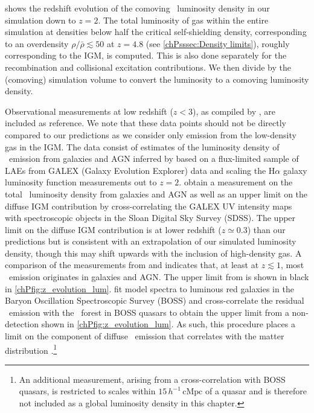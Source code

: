  shows the redshift evolution of the comoving \lya\ luminosity density in our simulation down to $z=2$. The total luminosity of gas within the entire simulation at densities below half the critical self-shielding density, corresponding to an overdensity $\rho/\bar{\rho} \lesssim 50$ at $z=4.8$ (see \cref{chPsssec:Density limits}), roughly corresponding to the IGM, is computed. This is also done separately for the recombination and collisional excitation contributions. We then divide by the (comoving) simulation volume to convert the luminosity to a comoving luminosity density.

Observational measurements at low redshift ($z<3$), as compiled by \citet{2019ApJ...877..150C}, are included as reference. We note that these data points should not be directly compared to our predictions as we consider only emission from the low-density gas in the IGM. The data consist of estimates of the luminosity density of \lya\ emission from galaxies and AGN inferred by \citet{2017ApJ...848..108W} based on a flux-limited sample of LAEs from GALEX (Galaxy Evolution Explorer) data and scaling the H$\alpha$ galaxy luminosity function measurements \citep{2013MNRAS.428.1128S} out to $z=2$. \citet{2019ApJ...877..150C} obtain a measurement on the total \lya\ luminosity density from galaxies and AGN as well as an upper limit on the diffuse IGM contribution by cross-correlating the GALEX UV intensity maps with spectroscopic objects in the Sloan Digital Sky Survey (SDSS). The upper limit on the diffuse IGM contribution is at lower redshift ($z \simeq 0.3$) than our predictions but is consistent with an extrapolation of our simulated luminosity density, though this may shift upwards with the inclusion of high-density gas. A comparison of the measurements from \citet{2019ApJ...877..150C} and \citet{2017ApJ...848..108W} indicates that, at least at $z \lesssim 1$, most \lya\ emission originates in galaxies and AGN. The upper limit from \citet[; converted to a luminosity density by \citealt{2019ApJ...877..150C}]{2018MNRAS.481.1320C} is shown in black in \cref{chPfig:z_evolution_lum}. \citet{2018MNRAS.481.1320C} fit model spectra to luminous red galaxies in the Baryon Oscillation Spectroscopic Survey (BOSS) and cross-correlate the residual \lya\ emission with the \lya\ forest in BOSS quasars to obtain the upper limit from a non-detection shown in \cref{chPfig:z_evolution_lum}. As such, this procedure places a limit on the component of diffuse \lya\ emission that correlates with the matter distribution \citep{2018MNRAS.481.1320C}.\footnote{An additional measurement, arising from a cross-correlation with BOSS quasars, is restricted to scales within $15 \, h^{-1} \, \mathrm{cMpc}$ of a quasar \citep[equivalent to only $\ssim 3\%$ of space, see][]{2018MNRAS.481.1320C} and is therefore not included as a global luminosity density in this chapter.}

